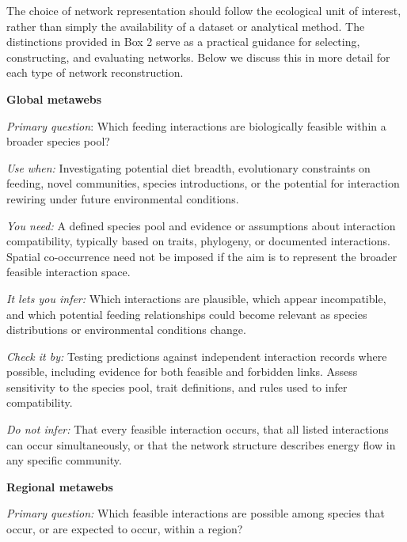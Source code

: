 \documentclass[
]{article}
\begin{document}
The choice of network representation should follow the ecological unit
of interest, rather than simply the availability of a dataset or
analytical method. The distinctions provided in Box 2 serve as a
practical guidance for selecting, constructing, and evaluating networks.
Below we discuss this in more detail for each type of network
reconstruction.

\begin{tcolorbox}[enhanced jigsaw, arc=.35mm, bottomrule=.15mm, bottomtitle=1mm, breakable, colback=white, colbacktitle=quarto-callout-note-color!10!white, colframe=quarto-callout-note-color-frame, coltitle=black, left=2mm, leftrule=.75mm, opacityback=0, opacitybacktitle=0.6, rightrule=.15mm, title=\textcolor{quarto-callout-note-color}{\faInfo}\hspace{0.5em}{Question mapping}, titlerule=0mm, toprule=.15mm, toptitle=1mm]

\textbf{Global metawebs}

\emph{Primary question}: Which feeding interactions are biologically
feasible within a broader species pool?

\emph{Use when:} Investigating potential diet breadth, evolutionary
constraints on feeding, novel communities, species introductions, or the
potential for interaction rewiring under future environmental
conditions.

\emph{You need:} A defined species pool and evidence or assumptions
about interaction compatibility, typically based on traits, phylogeny,
or documented interactions. Spatial co-occurrence need not be imposed if
the aim is to represent the broader feasible interaction space.

\emph{It lets you infer:} Which interactions are plausible, which appear
incompatible, and which potential feeding relationships could become
relevant as species distributions or environmental conditions change.

\emph{Check it by:} Testing predictions against independent interaction
records where possible, including evidence for both feasible and
forbidden links. Assess sensitivity to the species pool, trait
definitions, and rules used to infer compatibility.

\emph{Do not infer:} That every feasible interaction occurs, that all
listed interactions can occur simultaneously, or that the network
structure describes energy flow in any specific community.

\textbf{Regional metawebs}

\emph{Primary question:} Which feasible interactions are possible among
species that occur, or are expected to occur, within a region?


\end{tcolorbox}
\end{document}
